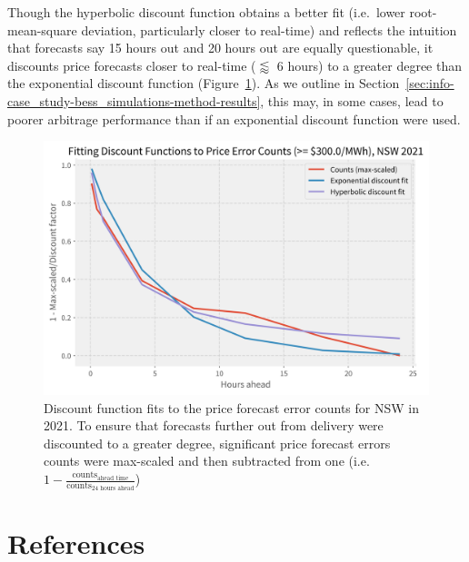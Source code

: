 \documentclass[12pt,a4paper,]{report}
\begin{document}
Though the hyperbolic discount function obtains a better fit (i.e.~lower
root-mean-square deviation, particularly closer to real-time) and
reflects the intuition that forecasts say 15 hours out and 20 hours out
are equally questionable, it discounts price forecasts closer to
real-time (\(\lessapprox\) 6 hours) to a greater degree than the
exponential discount function
(Figure~\ref{fig:discount_function_fitting}). As we outline in
Section~\ref{sec:info-case_study-bess_simulations-method-results}, this
may, in some cases, lead to poorer arbitrage performance than if an
exponential discount function were used.

\begin{figure}
\hypertarget{fig:discount_function_fitting}{%
\centering
\includegraphics{source/figures/curve_fits_300.0.png}
\caption{Discount function fits to the price forecast error counts for
NSW in 2021. To ensure that forecasts further out from delivery were
discounted to a greater degree, significant price forecast errors counts
were max-scaled and then subtracted from one
(i.e.~\(1-\frac{\textrm{counts}_{\textrm{ahead time}}}{\textrm{counts}_{\textrm{24 hours ahead}}}\))}\label{fig:discount_function_fitting}
}
\end{figure}

\footnotesize
\singlespacing
\setlength{\parindent}{0in}

\hypertarget{references}{%
\chapter*{References}\label{references}}
\end{document}

